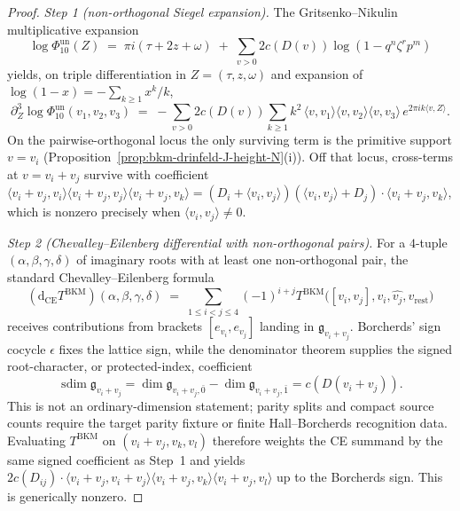 \begin{proof}
\emph{Step 1 (non-orthogonal Siegel expansion).}
The Gritsenko--Nikulin multiplicative expansion
\[
 \log\Phi_{10}^{\mathrm{un}}(Z) \;=\; \pi i(\tau + 2z + \omega)
 \;+\;\sum_{v>0} 2c(D(v))\log(1-q^{n}\zeta^{r}p^{m})
\]
yields, on triple differentiation in
$Z=(\tau,z,\omega)$ and expansion of $\log(1-x) = -\sum_{k\ge 1} x^k/k$,
\[
 \partial^3_Z\log\Phi_{10}^{\mathrm{un}}(v_1,v_2,v_3)
 \;=\;-\sum_{v>0} 2c(D(v))\sum_{k\ge 1} k^2\,
 \langle v,v_1\rangle\langle v,v_2\rangle\langle v,v_3\rangle\,
 e^{2\pi i k\langle v,Z\rangle}.
\]
On the pairwise-orthogonal locus the only surviving term is the
primitive support $v=v_i$ (Proposition~\ref{prop:bkm-drinfeld-J-height-N}(i)).
Off that locus, cross-terms at $v=v_i+v_j$ survive with coefficient
$\langle v_i+v_j,v_i\rangle\langle v_i+v_j,v_j\rangle\langle v_i+v_j,v_k\rangle
= (D_i+\langle v_i,v_j\rangle)(\langle v_i,v_j\rangle+D_j)\cdot\langle v_i+v_j,v_k\rangle$,
which is nonzero precisely when $\langle v_i,v_j\rangle\ne 0$.

\emph{Step 2 (Chevalley--Eilenberg differential with non-orthogonal pairs).}
For a $4$-tuple $(\alpha,\beta,\gamma,\delta)$ of imaginary roots with
at least one non-orthogonal pair, the standard Chevalley--Eilenberg
formula
\[
 (\mathrm d_{\mathrm{CE}}T^{\mathrm{BKM}})(\alpha,\beta,\gamma,\delta)
 \;=\;\sum_{1\le i<j\le 4}(-1)^{i+j}
 T^{\mathrm{BKM}}\bigl([v_i,v_j],\widehat{v_i},\widehat{v_j},v_{\mathrm{rest}}\bigr)
\]
receives contributions from brackets $[e_{v_i},e_{v_j}]$ landing in
$\mathfrak g_{v_i+v_j}$. Borcherds' sign cocycle $\epsilon$ fixes the
lattice sign, while the denominator theorem supplies the signed
root-character, or protected-index, coefficient
\[
 \operatorname{sdim}\mathfrak g_{v_i+v_j}
 =
 \dim\mathfrak g_{v_i+v_j,\bar0}-\dim\mathfrak g_{v_i+v_j,\bar1}
 =
 c(D(v_i+v_j)).
\]
This is not an ordinary-dimension statement; parity splits and compact
source counts require the target parity fixture or finite
Hall--Borcherds recognition data. Evaluating $T^{\mathrm{BKM}}$
on $(v_i+v_j, v_k, v_l)$ therefore weights the CE summand by the same
signed coefficient as Step~1 and yields
$2c(D_{ij})\cdot\langle v_i+v_j,v_i+v_j\rangle\langle v_i+v_j,v_k\rangle\langle v_i+v_j,v_l\rangle$
up to the Borcherds sign. This is generically nonzero.


\end{proof}
